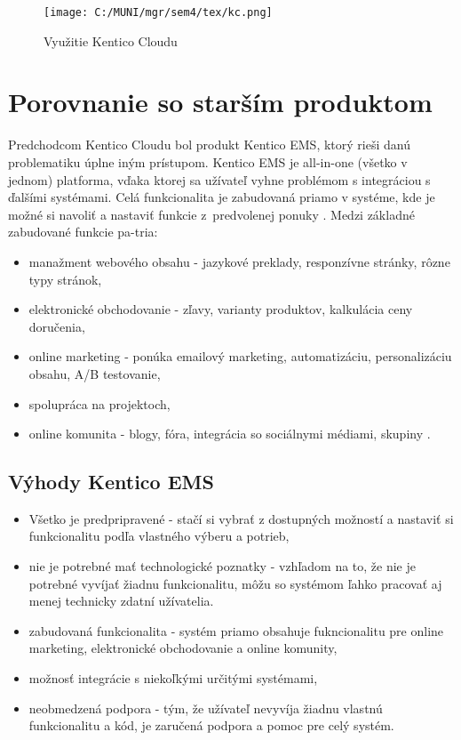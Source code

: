 \documentclass[
  printed, %
  table,   %
  lof,     %
  nolot,     %
  twoside,  
]{fithesis3}
\begin{document}
\begin{figure}[h]
  \begin{center}
        \texttt{[image: C:/MUNI/mgr/sem4/tex/kc.png]}
  \end{center}
  \caption{Využitie Kentico Cloudu \cite{cmsGuide}}
  \label{fig:kcuses}
\end{figure}

\section{Porovnanie so starším produktom}
Predchodcom Kentico Cloudu bol produkt Kentico EMS, ktorý rieši danú problematiku úplne iným prístupom. Kentico EMS je all-in-one (všetko v jednom) platforma, vďaka ktorej sa užívateľ vyhne problémom s integráciou s ďalšími systémami. Celá funkcionalita je zabudovaná priamo v systéme, kde je možné si navoliť a nastaviť funkcie z~predvolenej ponuky \cite{kcold}. Medzi základné zabudované funkcie pa-tria: 
\begin{itemize}
	\item manažment webového obsahu - jazykové preklady, responzívne stránky, rôzne typy stránok,
	\item elektronické obchodovanie - zľavy, varianty produktov, kalkulácia ceny doručenia,
	\item online marketing - ponúka emailový marketing, automatizáciu, personalizáciu obsahu, A/B testovanie,
	\item spolupráca na projektoch,
	\item online komunita - blogy, fóra, integrácia so sociálnymi médiami, skupiny \cite{kcguide}.
\end{itemize}
\subsection{Výhody Kentico EMS}
\begin{itemize}
	\item Všetko je predpripravené - stačí si vybrať z dostupných možností a nastaviť si funkcionalitu podľa vlastného výberu a potrieb,
	\item nie je potrebné mať technologické poznatky - vzhľadom na to, že nie je potrebné vyvíjať žiadnu funkcionalitu, môžu so systémom ľahko pracovať aj menej technicky zdatní užívatelia.
	\item zabudovaná funkcionalita - systém priamo obsahuje fukncionalitu pre online marketing, elektronické obchodovanie a online komunity,
	\item možnosť integrácie s niekoľkými určitými systémami,
	\item neobmedzená podpora - tým, že užívateľ nevyvíja žiadnu vlastnú funkcionalitu a kód, je zaručená podpora a pomoc pre celý systém.
\end{itemize}
\end{document}
